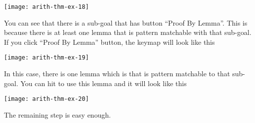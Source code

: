 \documentclass[master.tex]{subfiles}
\begin{document}
\texttt{[image: arith-thm-ex-18]}

\hspace{1ex}

You can see that there is a sub-goal that has button ``Proof By Lemma''. This is
because there is at least one lemma that is pattern matchable with that
sub-goal. If you click ``Proof By Lemma'' button, the keymap will look like this

\begin{center}
\texttt{[image: arith-thm-ex-19]}
\end{center}

In this case, there is one lemma which is  that is pattern
matchable to that sub-goal. You can hit  to use this lemma and it
will look like this

\texttt{[image: arith-thm-ex-20]}

The remaining step is easy enough.
\end{document}
